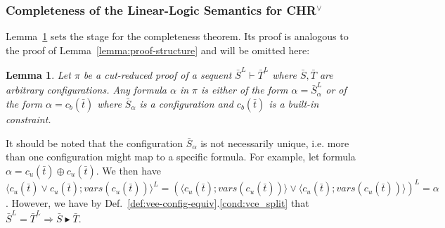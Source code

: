 \documentclass[acmtocl]{acmtrans2m}
\newtheorem{lemma}[theorem]{Lemma}
\newcommand\state[1]{\langle #1 \rangle}
\newcommand\entv{\blacktriangleright}
\newcommand{\cb}{\ensuremath{c_b(\bar t)}}
\newcommand{\cu}{\ensuremath{c_u(\bar t)}}
\newcommand{\bS}{\bar{S}}
\newcommand{\bT}{\bar{T}}
\begin{document}
\subsubsection{Completeness of the Linear-Logic Semantics for
CHR$^\vee$}

Lemma~\ref{lemma:vee-proof-structure} sets the stage for the completeness
theorem. Its proof is analogous to the proof of Lemma~\ref{lemma:proof-structure}
and will be omitted here:

\begin{lemma}
\label{lemma:vee-proof-structure}
Let $\pi$ be a cut-reduced proof of a sequent $\bS^L\vdash \bT^L$ where $\bS,\bT$
are arbitrary configurations. Any formula $\alpha$ in $\pi$ is either of the form
$\alpha=\bS_\alpha^L$ or of the form $\alpha=\cb$ where $\bS_\alpha$ is a
configuration and $\cb$ is a built-in constraint.
\end{lemma}

It should be noted that the configuration
$\bS_\alpha$ is not necessarily unique, i.e. more than one configuration might
map to a specific formula. For example, let formula $\alpha=\cu\oplus\cu$. We
then have
$\state{\cu\vee\cu;vars(\cu)}^L
=(\state{\cu;vars(\cu)}\vee\state{\cu;vars(\cu)})^L=\alpha$. However, we
have by Def.~\ref{def:vee-config-equiv}.\ref{cond:vce_split} that
$\bS^L=\bT^L\Rightarrow \bS\entv\bT$.
\end{document}
